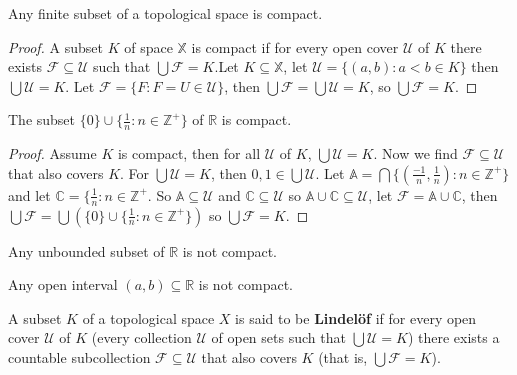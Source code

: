 \documentclass{article}
\begin{document}
	\begin{proposition}
	  Any finite subset of a topological space is compact.
	\end{proposition}
	
	\begin{proof}
	
	A subset $K$ of space $\mathbb{X}$ is compact if for every open cover $\mathcal{U}$ of $K$ there exists $\mathcal{F} \subseteq \mathcal{U}$ such that $\bigcup \mathcal{F} = K$.\newline Let $K \subseteq \mathbb{X}$, let $\mathcal{U} = \lbrace (a, b) : a < b \in K \rbrace$ then $\bigcup \mathcal{U} = K$. Let $\mathcal{F} = \lbrace F : F = U \in \mathcal{U} \rbrace$, then $\bigcup \mathcal{F} = \bigcup \mathcal{U} = K$, so $\bigcup \mathcal{F} = K$.
	
	\end{proof}

	\begin{proposition}
	  The subset \(\{0\}\cup\{\frac{1}{n}:n\in\mathbb Z^+\}\) of \(\mathbb R\) is compact.
	\end{proposition}		

	\begin{proof}

	Assume $K$ is compact, then for all $\mathcal{U}$ of $K$, $\bigcup \mathcal{U} = K$. Now we find $\mathcal{F} \subseteq \mathcal{U}$ that also covers $K$. For $\bigcup \mathcal{U} = K$, then $0, 1 \in \bigcup \mathcal{U}$. Let $\mathbb{A} = \bigcap \lbrace (\frac{-1}{n}, \frac{1}{n}) : n \in \mathbb{Z}^+ \rbrace$ and let $\mathbb{C} = \lbrace \frac{1}{n} : n \in \mathbb{Z}^+$. So $\mathbb{A} \subseteq \mathcal{U}$ and $\mathbb{C} \subseteq \mathcal{U}$ so $\mathbb{A} \cup \mathbb{C} \subseteq \mathcal{U}$, let $\mathcal{F} = \mathbb{A} \cup \mathbb{C}$, then $\bigcup \mathcal{F} = \bigcup( \lbrace 0 \rbrace \cup \lbrace \frac{1}{n} : n \in \mathbb{Z}^+ \rbrace)$ so $\bigcup \mathcal{F} = K$.
	
	\end{proof}

	\begin{proposition}
	  Any unbounded subset of \(\mathbb R\) is not compact.
	\end{proposition}

	\begin{proposition}
	  Any open interval \((a,b)\subseteq\mathbb R\) is not compact.
	\end{proposition}

	\begin{definition}
	  A subset \(K\) of a topological space \(X\) is said to be \textbf{Lindel\"of} if for every
	  open cover \(\mathcal U\) of \(K\) (every collection \(\mathcal U\) of open sets
	  such that \(\bigcup \mathcal U=K\)) there exists a countable subcollection
	  \(\mathcal F\subseteq \mathcal U\) that also covers \(K\) (that is,
	  \(\bigcup\mathcal F=K\)).
	\end{definition}
\end{document}
